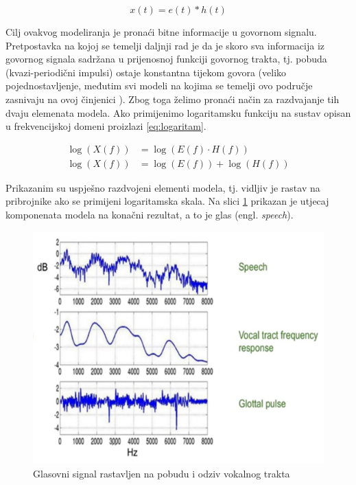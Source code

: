\begin{equation}
    x(t) = e(t) \ast h(t)
    \label{eq:govor_vremenska}
\end{equation}

Cilj ovakvog modeliranja je pronaći bitne informacije u govornom signalu. Pretpostavka na
kojoj se temelji daljnji rad je da je skoro sva informacija iz govornog signala sadržana
u prijenosnoj funkciji govornog trakta, tj. pobuda (kvazi-periodični impulsi) ostaje
konstantna tijekom govora (veliko pojednostavljenje, međutim svi modeli na kojima
se temelji ovo područje zasnivaju na ovoj činjenici \cite{multiplier, emotion, sidhu2024mfcc}).
Zbog toga želimo pronaći način za 
razdvajanje tih dvaju elemenata modela. Ako primijenimo logaritamsku funkciju na
sustav opisan u frekvencijskoj domeni proizlazi \ref{eq:logaritam}.

\begin{equation}
    \label{eq:logaritam}
    \begin{aligned}
        \log(X(f)) &= \log(E(f) \cdot H(f)) \\
        \log(X(f)) &= \log(E(f)) + \log(H(f))
    \end{aligned}
\end{equation}

Prikazanim su uspješno razdvojeni elementi modela, tj. vidljiv je rastav na pribrojnike
ako se primijeni logaritamska skala. Na slici \ref{pic:rastav} prikazan je utjecaj
komponenata modela na konačni rezultat, a to je glas (engl. \textit{speech}). 

\begin{figure}[htb]
    \centering
    \includegraphics[width=0.6\linewidth]{Chapters/struktura_sustava/generiranje_znacajki/log.png} 
    \caption{Glasovni signal rastavljen na pobudu i odziv vokalnog trakta \cite{sidhu2024mfcc}}
    \label{pic:rastav}
\end{figure}

